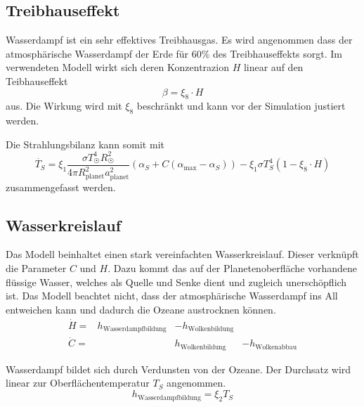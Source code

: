 \begin{refsection}
\subsection{Treibhauseffekt}
Wasserdampf ist ein sehr effektives Treibhausgas. Es wird angenommen dass der atmosphärische Wasserdampf der Erde für 60\% des Treibhauseffekts sorgt.  
Im verwendeten Modell wirkt sich deren Konzentrazion $H$ linear auf den Teibhauseffekt 
\begin{equation}
\beta  = \xi_8 \cdot H
\end{equation}
aus. Die Wirkung wird mit $\xi_8$ beschränkt und kann vor der Simulation justiert werden.

Die Strahlungsbilanz kann somit mit
\begin{equation}
\dot{T_S} = \xi_1 \frac{\sigma T_{\astrosun}^4 R_{\astrosun}^2}{4 \pi R_{\text{planet}}^2 a_{\text{planet}}^2} (\alpha_S + C(\alpha_{\text{max}} - \alpha_S)) - \xi_1 \sigma T_{S}^4  (1 - \xi_8 \cdot H)
\end{equation}
zusammengefasst werden.

\subsection{Wasserkreislauf}
Das Modell beinhaltet einen stark vereinfachten Wasserkreislauf.
Dieser verknüpft die Parameter $C$ und $H$.
Dazu kommt das auf der Planetenoberfläche vorhandene flüssige Wasser, welches als Quelle und Senke dient und zugleich unerschöpflich ist. Das Modell beachtet nicht, dass der atmosphärische Wasserdampf ins All entweichen kann und dadurch die Ozeane austrocknen können.
\begin{equation}
\begin{matrix}
\dot{H}   = & h_{\text{Wasserdampfbildung}} & - h_{\text{Wolkenbildung}}   &                      \\
\dot{C}   = &                     		    &   h_{\text{Wolkenbildung}}   & - h_{\text{Wolkenabbau}}
\end{matrix}
\end{equation}

Wasserdampf bildet sich durch Verdunsten von der Ozeane. Der Durchsatz wird linear zur Oberflächentemperatur $T_S$ angenommen.
\begin{equation}
h_{\text{Wasserdampfbildung}} = \xi_2 T_S
\end{equation}


\end{refsection}
